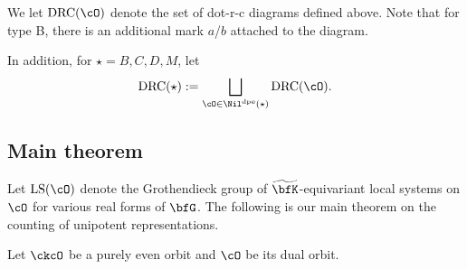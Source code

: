 \documentclass[12pt,a4paper]{amsart}
\numberwithin{equation}{section}
\theoremstyle{remark}
\def\wtbfK{\widetilde{\bfK}}
\def\dpeNil{\Nil^{\mathrm{dpe}}}
\def\drc{\mathrm{DRC}}
\def\LS{\mathrm{LS}}
\newcommand{\ess}{essential }
\begin{document}
We let $\drc(\cO)$ denote the set of dot-r-c diagrams defined above.
Note that for type B, there is an additional mark $a$/$b$ attached to the
diagram.



In addition, for $\star=B,C,D,M$, let
\[
  \drc(\star) := \bigsqcup_{\cO\in \dpeNil(\star)} \drc(\cO).
\]



\subsection{Main theorem}
Let $\LS(\cO)$ denote the Grothendieck group of $\wtbfK$-equivariant local
systems on $\cO$ for various real forms of $\bfG$.
The following is our main theorem on the counting of unipotent representations.

Let $\ckcO$ be a purely even orbit and $\cO$ be its dual orbit.
\end{document}
